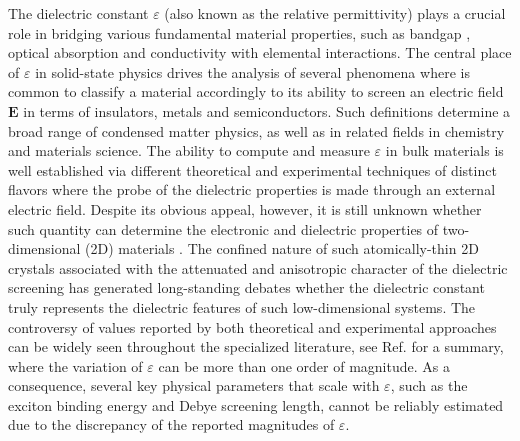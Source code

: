 \documentclass[journal=ancac3,manuscript=article,email=true,hyperref=true,keywords=false]{achemso}
\begin{document}
The dielectric constant $\varepsilon$ (also known as the relative permittivity) 
plays a crucial role in bridging various fundamental material
properties, such as bandgap \cite{Moss_1950_relation,Moss_1985_n_Eg}, 
optical absorption\cite{kittel_2005_introduction} and 
conductivity \cite{Dressel_2001_electrodynamics}   
with elemental interactions. 
The central place of $\varepsilon$ in solid-state physics drives the analysis of several phenomena 
where is common to classify a material accordingly to its ability to screen an 
electric field $\boldsymbol{E}$ in terms of insulators, metals and semiconductors. 
Such definitions determine a broad range of 
condensed matter physics, as well as in related 
fields in chemistry and materials science. 
The ability to compute and measure $\varepsilon$ in 
bulk materials is well established via different 
theoretical \cite{Adler_1962,Hybertsen_1987} and 
experimental techniques \cite{palik_1998handbook} of distinct flavors
where the probe of the dielectric properties 
is made through an external electric field. 
%
Despite its obvious appeal, however, it is 
still unknown whether such quantity can determine the 
electronic and dielectric properties of 
two-dimensional (2D) materials \cite{Novoselov_2016}.  
%
The confined nature of such atomically-thin 2D crystals associated
with the attenuated and anisotropic character of the dielectric
screening
\cite{Keldysh_1979_eps_multi,Sharma_1985,Low_2014_screening_BP,Cudazzo_2011_screening_2D,Bechstedt_2012,Cudazzo_2010_screen2D,Nazarov_2015_2D_3D}
has generated long-standing debates whether the dielectric constant
truly represents the dielectric features of such low-dimensional systems. 
%
%
The controversy of values
reported by both theoretical and experimental
approaches can be widely seen throughout the specialized 
literature, see Ref.\cite{Li_2016} for a summary,
where the variation of $\varepsilon$ can be more than one order of
magnitude. As a consequence, several key physical parameters that
scale with $\varepsilon$, such as the exciton binding energy and
Debye screening length, cannot be reliably estimated due to the
discrepancy of the reported magnitudes of $\varepsilon$. 
\end{document}
